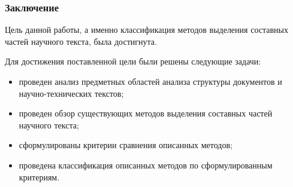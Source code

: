 \documentclass[gray]{beamer}
\begin{document}
\begin{frame}
    \frametitle{Заключение}
Цель данной работы, а именно классификация методов выделения составных частей научного текста, была достигнута.

Для достижения поставленной цели были решены следующие задачи:
\begin{itemize}
    \item проведен анализ предметных областей анализа структуры документов и научно-технических текстов;
    \item проведен обзор существующих методов выделения составных частей научного текста;
    \item сформулированы критерии сравнения описанных методов;
    \item проведена классификация описанных методов по сформулированным критериям.
\end{itemize}
\end{frame}
\end{document}
